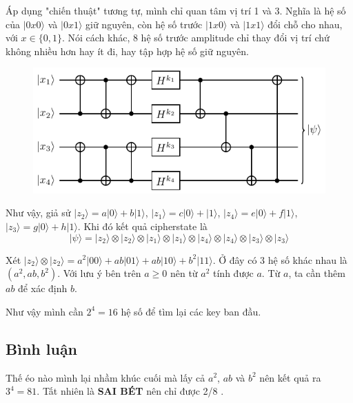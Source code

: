 Áp dụng "chiến thuật" tương tự, mình chỉ quan tâm vị trí 1 và 3. Nghĩa là hệ số của $\lvert 0 x 0 \rangle$ và $\lvert 0 x 1 \rangle$ giữ nguyên, còn hệ số trước $\lvert 1 x 0 \rangle$ và $\lvert 1 x 1 \rangle$ đổi chỗ cho nhau, với $x \in \{ 0, 1 \}$. Nói cách khác, 8 hệ số trước amplitude chỉ thay đổi vị trí chứ không nhiều hơn hay ít đi, hay tập hợp hệ số giữ nguyên.

\begin{figure}[ht]
    \centering
    \includegraphics[page=8]{nsucrypto/problem10_figures.pdf}
\end{figure}

Như vậy, giả sử $\lvert z_2 \rangle = a \lvert 0 \rangle + b \lvert 1 \rangle$, $\lvert z_1 \rangle = c \lvert 0 \rangle + \lvert 1 \rangle$, $\lvert z_4 \rangle = e \lvert 0 \rangle + f \lvert 1 \rangle$, $\lvert z_3 \rangle = g \lvert 0 \rangle + h \lvert 1 \rangle$. Khi đó kết quả cipherstate là
\begin{equation*}
    \lvert \psi \rangle = \lvert z_2 \rangle \otimes \lvert z_2 \rangle \otimes \lvert z_1 \rangle \otimes \lvert z_1 \rangle \otimes \lvert z_4 \rangle \otimes \lvert z_4 \rangle \otimes \lvert z_3 \rangle \otimes \lvert z_3 \rangle
\end{equation*}

Xét $\lvert z_2 \rangle \otimes \lvert z_2 \rangle = a^2 \lvert 00 \rangle + ab \lvert 01 \rangle + ab \lvert 10 \rangle + b^2 \lvert 11 \rangle$. Ở đây có 3 hệ số khác nhau là $(a^2, ab, b^2)$. Với lưu ý bên trên $a \geqslant 0$ nên từ $a^2$ tính được $a$. Từ $a$, ta cần thêm $ab$ để xác định $b$.

Như vậy mình cần $2^4 = 16$ hệ số để tìm lại các key ban đầu.

\subsection*{Bình luận}

Thế éo nào mình lại nhầm khúc cuối mà lấy cả $a^2$, $ab$ và $b^2$ nên kết quả ra $3^4 = 81$. Tất nhiên là \textbf{SAI BÉT} nên chỉ được 2/8 .

